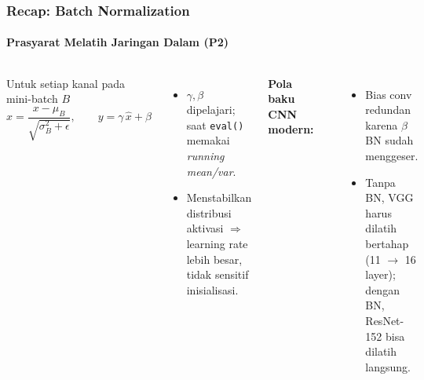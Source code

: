 \documentclass[t,aspectratio=169,xcolor=dvipsnames]{beamer}
\begin{document}
\begin{frame}
    \frametitle{Recap: Batch Normalization}
    \framesubtitle{Prasyarat Melatih Jaringan Dalam (P2)}
    \footnotesize

    \begin{columns}[T]
        \begin{block}{Untuk setiap kanal pada mini-batch $B$}
            $$\hat{x}=\frac{x-\mu_B}{\sqrt{\sigma_B^2+\epsilon}}, \qquad y=\gamma\,\hat{x}+\beta$$
        \end{block}
        \begin{itemize}
            \item $\gamma,\beta$ dipelajari; saat \texttt{eval()} memakai \textit{running mean/var}.
            \item Menstabilkan distribusi aktivasi $\Rightarrow$ learning rate lebih besar, tidak sensitif inisialisasi.
        \end{itemize}

        \textbf{Pola baku CNN modern:}
        \begin{center}
        \end{center}
        \begin{itemize}
            \item Bias conv redundan karena $\beta$ BN sudah menggeser.
            \item Tanpa BN, VGG harus dilatih bertahap (11 $\to$ 16 layer); dengan BN, ResNet-152 bisa dilatih langsung.
        \end{itemize}
    \end{columns}
\end{frame}
\end{document}
